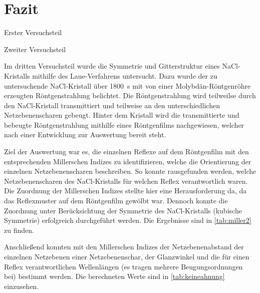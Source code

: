 \section{Fazit}\label{sec:fazit}
Erster Versuchsteil\\ \par
Zweiter Versuchsteil\\ \par
Im dritten Versuchsteil wurde die Symmetrie und Gitterstruktur eines NaCl-Kristalls mithilfe des Laue-Verfahrens
untersucht. Dazu wurde der zu untersuchende NaCl-Kristall über \SI{1800}{\second} mit von einer
Molybdän-Röntgenröhre erzeugten Röntgenstrahlung belichtet. Die Röntgenstrahlung wird teilweilse durch den
NaCl-Kristall transmittiert und teilweise an den unterschiedlichen Netzebenenscharen gebeugt. Hinter dem Kristall
wird die transmittierte und bebeugte Röntgenstrahlung mithilfe eines Röntgenfilms nachgewiesen, welcher nach
einer Entwicklung zur Auswertung bereit steht.\par
Ziel der Auswertung war es, die einzelnen Reflexe auf dem Röntgenfilm mit den entsprechenden Millerschen Indizes
zu identifizieren, welche die Orientierung der einzelnen Netzebenenscharen beschreiben. So konnte rausgefunden werden,
welche Netzebenenscharen des NaCl-Kristalls für welchen Reflex verantwortlich waren. Die Zuordnung der Millerschen
Indizes stellte hier eine Herausforderung da, da das Reflexmuster auf dem Röntgenfilm gewölbt war. Dennoch konnte
die Zuordnung unter Berücksichtung der Symmetrie des NaCl-Kristalls (kubische Symmetrie) erfolgreich durchgeführt werden.
Die Ergebnisse sind in \cref{tab:miller2} zu finden.\par
Anschließend konnten mit den Millerschen Indizes der Netzebenenabstand der einzelnen Netzebenen einer Netzebenenschar,
der Glanzwinkel und die für einen Reflex verantwortlichen Wellenlängen (es tragen mehrere Beugungsordnungen bei)
bestimmt werden. Die berechneten Werte sind in \cref{tab:keineahnung} einzusehen.